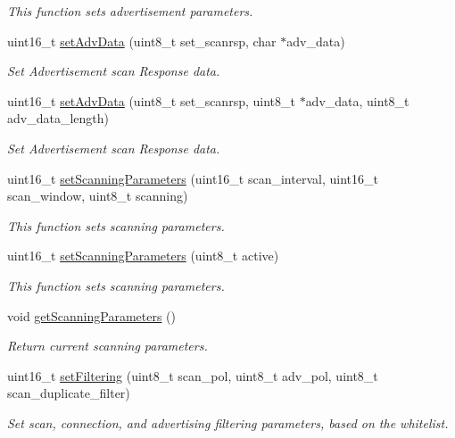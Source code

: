 \begin{DoxyCompactItemize}
\begin{DoxyCompactList}\small\item\em This function sets advertisement parameters. \end{DoxyCompactList}\item 
uint16\+\_\+t \hyperlink{class_wasp_b_l_e_a8d785a0c9e367e8fbf1c71881c070aa6}{set\+Adv\+Data} (uint8\+\_\+t set\+\_\+scanrsp, char $\ast$adv\+\_\+data)
\begin{DoxyCompactList}\small\item\em Set Advertisement scan Response data. \end{DoxyCompactList}\item 
uint16\+\_\+t \hyperlink{class_wasp_b_l_e_aa25b1965a012b6bef20bd376ef5f7d26}{set\+Adv\+Data} (uint8\+\_\+t set\+\_\+scanrsp, uint8\+\_\+t $\ast$adv\+\_\+data, uint8\+\_\+t adv\+\_\+data\+\_\+length)
\begin{DoxyCompactList}\small\item\em Set Advertisement scan Response data. \end{DoxyCompactList}\item 
uint16\+\_\+t \hyperlink{class_wasp_b_l_e_a649d471162e0974716e21feae52605d0}{set\+Scanning\+Parameters} (uint16\+\_\+t scan\+\_\+interval, uint16\+\_\+t scan\+\_\+window, uint8\+\_\+t scanning)
\begin{DoxyCompactList}\small\item\em This function sets scanning parameters. \end{DoxyCompactList}\item 
uint16\+\_\+t \hyperlink{class_wasp_b_l_e_a3ca4dca79c158a085974becaf39cd45e}{set\+Scanning\+Parameters} (uint8\+\_\+t active)
\begin{DoxyCompactList}\small\item\em This function sets scanning parameters. \end{DoxyCompactList}\item 
void \hyperlink{class_wasp_b_l_e_a71d30ceb0f22894417bf5e672b4c5392}{get\+Scanning\+Parameters} ()
\begin{DoxyCompactList}\small\item\em Return current scanning parameters. \end{DoxyCompactList}\item 
uint16\+\_\+t \hyperlink{class_wasp_b_l_e_a5f7562c538e4aa5580ef1fab647f802a}{set\+Filtering} (uint8\+\_\+t scan\+\_\+pol, uint8\+\_\+t adv\+\_\+pol, uint8\+\_\+t scan\+\_\+duplicate\+\_\+filter)
\begin{DoxyCompactList}\small\item\em Set scan, connection, and advertising filtering parameters, based on the whitelist. \end{DoxyCompactList}\item 

\end{DoxyCompactItemize}
